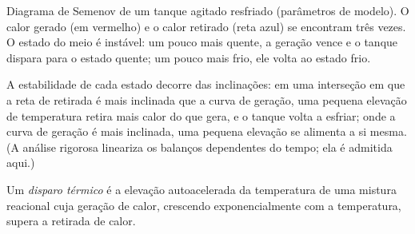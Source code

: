 \begin{omfigure}

{\small Diagrama de Semenov de um tanque agitado resfriado (parâmetros de
modelo). O calor gerado (em vermelho) e o calor retirado (reta azul) se
encontram três vezes. O estado do meio é instável: um pouco mais quente, a
geração vence e o tanque dispara para o estado quente; um pouco mais frio,
ele volta ao estado frio.}
\end{omfigure}

A estabilidade de cada estado decorre das inclinações: em uma interseção
em que a reta de retirada é mais inclinada que a curva de geração, uma
pequena elevação de temperatura retira mais calor do que gera, e o tanque
volta a esfriar; onde a curva de geração é mais inclinada, uma pequena
elevação se alimenta a si mesma. (A análise rigorosa lineariza os balanços
dependentes do tempo; ela é admitida aqui.)

\begin{definition}\label{def:b2:continuous-reactors:runaway}
Um \emph{disparo térmico} é a elevação
autoacelerada da temperatura de uma mistura reacional cuja geração de calor,
crescendo exponencialmente com a temperatura, supera a retirada de calor.
\end{definition}

